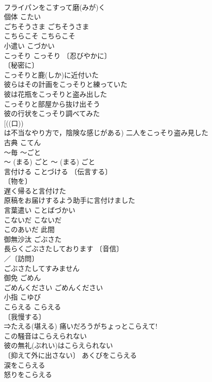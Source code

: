 \documentclass[8pt]{extreport}
\begin{document}
\begin{CJK}{UTF8}{min}
\\	フライパンをこすって磨(みが)く 
\\	個体	こたい	
\\	ごちそうさま	ごちそうさま	
\\	こちらこそ	こちらこそ	
\\	小遣い	こづかい	
\\	こっそり	こっそり	〔忍びやかに〕
\\	〔秘密に〕
\\	こっそりと鹿(しか)に近付いた 
\\	彼らはその計画をこっそりと練っていた 
\\	彼は花瓶をこっそりと盗み出した 
\\	こっそりと部屋から抜け出そう 
\\	彼の行状をこっそり調べてみた 
\\	[((口))
\\	は不当なやり方で，陰険な感じがある) 二人をこっそり盗み見した 
\\	古典	こてん	
\\	～毎	～ごと	
\\	〜 (まる) ごと	〜 (まる) ごと	
\\	言付ける	ことづける	〔伝言する〕
\\	〔物を〕
\\	遅く帰ると言付けた 
\\	原稿をお届けするよう助手に言付けました 
\\	言葉遣い	ことばづかい	
\\	こないだ	こないだ	
\\	このあいだ 此間
\\	御無沙汰	ごぶさた	
\\	長らくごぶさたしております 〔音信〕
\\	／〔訪問〕
\\	ごぶさたしてすみません 
\\	御免	ごめん	
\\	ごめんください	ごめんください	
\\	小指	こゆび	
\\	こらえる	こらえる	
\\	〔我慢する〕
\\	⇒たえる(堪える) 痛いだろうがちょっとこらえて! 
\\	この騒音はこらえられない 
\\	彼の無礼(ぶれい)はこらえられない 
\\	〔抑えて外に出さない〕 あくびをこらえる 
\\	涙をこらえる 
\\	怒りをこらえる 

\end{CJK}
\end{document}
